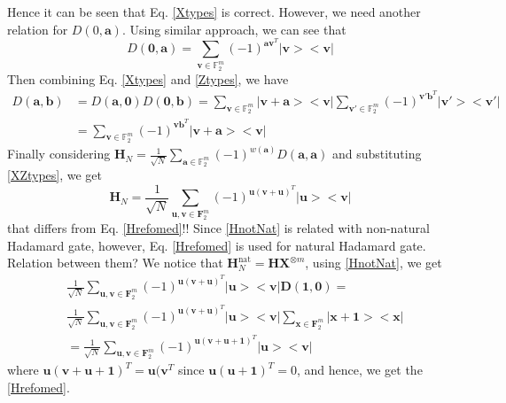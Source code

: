\documentclass{article}
\begin{document}
		Hence it can be seen that Eq. \eqref{Xtypes} is correct. However, we need another relation for $D\left(0, \mathbf{a}\right)$. Using similar approach, we can see that 
		\begin{equation}\label{Ztypes}
			D\left(\mathbf{0},\mathbf{a}\right) = \sum_{\mathbf{v}\in \mathbb{F}_2^m}{ (-1)^{\mathbf{a} \mathbf{v}^T} |\mathbf{v}><\mathbf{v}|}
		\end{equation}
		Then combining Eq. \eqref{Xtypes} and \eqref{Ztypes}, we have 
		\begin{align}\label{XZtypes}
			D\left(\mathbf{a}, \mathbf{b}\right) &= D\left(\mathbf{a}, \mathbf{0}\right) D\left(\mathbf{0}, \mathbf{b}\right) = \sum_{\mathbf{v} \in \mathbb{F}_2^m}{|\mathbf{v+a}><\mathbf{v}|}  \sum_{\mathbf{v}'\in \mathbb{F}_2^m}{ (-1)^{\mathbf{v}' \mathbf{b}^T} |\mathbf{v}'><\mathbf{v}'|} \nonumber \\
			& = \sum_{\mathbf{v} \in \mathbb{F}_2^m}{(-1)^{\mathbf{v} \mathbf{b}^T} |\mathbf{v+a}><\mathbf{v}|}
		\end{align}
		Finally considering $\mathbf{H}_N = \frac{1}{\sqrt{N}} \sum_{\mathbf{a} \in \mathbb{F}_2^m} (-1)^{w(\mathbf{a})} D\left( \mathbf{a}, \mathbf{a} \right)$ and substituting \eqref{XZtypes}, we get
		\begin{equation}\label{HnotNat}
			\mathbf{H}_N = \frac{1}{\sqrt{N}} \sum_{\mathbf{u}, \mathbf{v} \in \mathbf{F}_2^m}{\left(-1\right)^{\mathbf{u} (\mathbf{v+u})^T } |\mathbf{u}><\mathbf{v}|}
		\end{equation}
	that differs from	Eq. \eqref{Hrefomed}!! Since \eqref{HnotNat} is related with non-natural Hadamard gate, however, Eq. \eqref{Hrefomed} is used for natural Hadamard gate. Relation between them? We notice that $\mathbf{H}_N^{\text{nat}} = \mathbf{H}\mathbf{X}^{\otimes m}$, using \eqref{HnotNat}, we get
	\begin{align*}
		&\frac{1}{\sqrt{N}} \sum_{\mathbf{u}, \mathbf{v} \in \mathbf{F}_2^m}{\left(-1\right)^{\mathbf{u} (\mathbf{v+u})^T } |\mathbf{u}><\mathbf{v}|}\mathbf{D}(\mathbf{1,0}) = \\
		& \frac{1}{\sqrt{N}} \sum_{\mathbf{u}, \mathbf{v} \in \mathbf{F}_2^m}{\left(-1\right)^{\mathbf{u} (\mathbf{v+u})^T } |\mathbf{u}><\mathbf{v}|}\sum_{\mathbf{x} \in \mathbf{F}_2^m}{ |\mathbf{x+1}><\mathbf{x}|} \\
		& =  \frac{1}{\sqrt{N}} \sum_{\mathbf{u}, \mathbf{v} \in \mathbf{F}_2^m}{\left(-1\right)^{\mathbf{u} (\mathbf{v+u+1})^T } |\mathbf{u}><\mathbf{v}|}
	\end{align*}
where $\mathbf{u}(\mathbf{v+u+1})^T=\mathbf{u}(\mathbf{v}^T$ since $\mathbf{u}(\mathbf{u+1})^T=0$, and hence, we get the \eqref{Hrefomed}.
\end{document}
